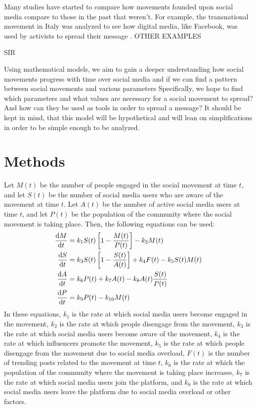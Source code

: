 \documentclass{article}
\begin{document}
    Many studies have started to compare how movements founded upon social media compare to those in the past that weren't. For example, the transnational movement in Italy was analyzed to see how digital media, like Facebook, was used by activists to spread their message \cite{pavan_digital_2019}. OTHER EXAMPLES

    SIR

    Using mathematical models, we aim to gain a deeper understanding how social movements progress with time over social media and if we can find a pattern between social movements and various parameters Specifically, we hope to find which parameters and what values are necessary for a social movement to spread? And how can they be used as tools in order to spread a message?
    It should be kept in mind, that this model will be hypothetical and will lean on simplifications in order to be simple enough to be analyzed.
    
    \section{Methods}
        Let $M(t)$ be the number of people engaged in the social movement at time $t$, and let $S(t)$ be the number of social media users who are aware of the movement at time $t$. Let $A(t)$ be the number of active social media users at time $t$, and let $P(t)$ be the population of the community where the social movement is taking place. Then, the following equations can be used:
        \begin{align}
            \diff Mt &= k_1 S(t) \left[1 - \frac{M(t)}{P(t)}\right] - k_2M(t)
            \\
            \diff St &= k_3 S(t)\left[1 - \frac{S(t)}{A(t)}\right] + k_4 F(t) - k_5 S(t)M(t)
            \\
            \diff At &= k_6 P(t) + k_7A(t) - k_8A(t)\frac{S(t)}{P(t)}
            \\
            \diff Pt &= k_9 P(t) - k_{10}M(t)
        \end{align}
        In these equations, $k_1$ is the rate at which social media users become engaged in the movement, $k_2$ is the rate at which people disengage from the movement, $k_3$ is the rate at which social media users become aware of the movement, $k_4$ is the rate at which influencers promote the movement, $k_5$ is the rate at which people disengage from the movement due to social media overload, $F(t)$ is the number of trending posts related to the movement at time $t$, $k_6$ is the rate at which the population of the community where the movement is taking place increases, $k_7$ is the rate at which social media users join the platform, and $k_8$ is the rate at which social media users leave the platform due to social media overload or other factors.
        
\end{document}
